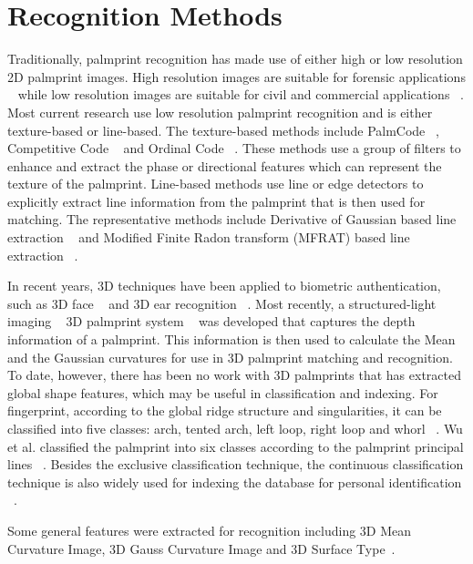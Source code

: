\section{Recognition Methods}
\label{sec:pastwork:recogmethods}

Traditionally, palmprint recognition has made use of either high or low resolution 2D palmprint images. High resolution images are suitable for forensic applications ~\cite{Jain:2009kj} while low resolution images are suitable for civil and commercial applications ~\cite{Zhang:2003uf}. Most current research use low resolution palmprint recognition and is either texture-based or line-based. The texture-based methods include PalmCode ~\cite{Zhang:2003uf}, Competitive Code ~\cite{Kong:2004wq} and Ordinal Code ~\cite{Zhenan:2005wg}. These methods use a group of filters to enhance and extract the phase or directional features which can represent the texture of the palmprint. Line-based methods use line or edge detectors to explicitly extract line information from the palmprint that is then used for matching. The representative methods include Derivative of Gaussian based line extraction ~\cite{Wu:2006wa} and Modified Finite Radon transform (MFRAT) based line extraction ~\cite{Huang:2008ep}.

In recent years, 3D techniques have been applied to biometric authentication, such as 3D face ~\cite{Samir:2006vj} and 3D ear recognition ~\cite{Yan:2007fv}. Most recently, a structured-light imaging ~\cite{Halioua:1984ue,Saldner:1997tu} 3D palmprint system ~\cite{Zhang:2009dp} was developed that captures the depth information of a palmprint. This information is then used to calculate the Mean and the Gaussian curvatures for use in 3D palmprint matching and recognition. To date, however, there has been no work with 3D palmprints that has extracted global shape features, which may be useful in classification and indexing. For fingerprint, according to the global ridge structure and singularities, it can be classified into five classes: arch, tented arch, left loop, right loop and whorl ~\cite{Henry:1900vc}. Wu et al. classified the palmprint into six classes according to the palmprint principal lines ~\cite{Wu:2004kx}. Besides the exclusive classification technique, the continuous classification technique is also widely used for indexing the database for personal identification ~\cite{Lumini:1997vv}.

Some general features were extracted for recognition including 3D Mean Curvature Image, 3D Gauss Curvature Image and 3D Surface Type~\cite{Zhang:2008kc,Li:2009eq}.

